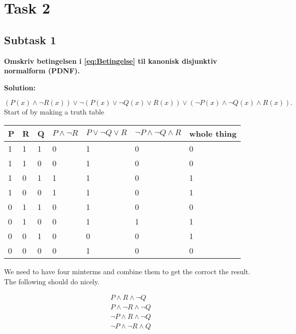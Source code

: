 \section{Task 2}
\subsection{Subtask 1}
\noindent
\textbf{Omskriv betingelsen i \eqref{eq:Betingelse} til kanonisk disjunktiv normalform (PDNF). }

\bigskip
\noindent
\textbf{Solution:} 

\begin{equation}
	(P(x)\wedge \neg R(x)) \vee \neg(P(x)\vee \neg Q(x) \vee R(x)) \vee (\neg P(x) \wedge \neg Q(x) \wedge R(x)).
\end{equation}
Start of by making a truth table 
\begin{table}[ht!]
\centering
\begin{tabular}{|l|l|l|l|l|l|l|}
P & R & Q & $P\wedge \neg R$ & $P\vee \neg Q \vee R$ & $\neg P \wedge \neg Q \wedge R$ & whole thing \\ \hline
1    & 1    & 1    & 0           & 1               & 0                     & 0               \\ \hline
1    & 1    & 0    & 0           & 1               & 0                     & 0               \\ \hline
1    & 0    & 1    & 1           & 1               & 0                     & 1               \\ \hline
1    & 0    & 0    & 1           & 1               & 0                     & 1               \\ \hline
0    & 1    & 1    & 0           & 1               & 0                     & 0               \\ \hline
0    & 1    & 0    & 0           & 1               & 1                     & 1               \\ \hline
0    & 0    & 1    & 0           & 0               & 0                     & 1               \\ \hline
0    & 0    & 0    & 0           & 1               & 0                     & 0               \\ \hline
\end{tabular}
\end{table}

We need to have four minterms and combine them to get the corroct the result. The following should do nicely.

\begin{equation} 
    \begin{aligned}
        P \wedge R \wedge \neg Q \\
        P \wedge \neg R \wedge \neg Q \\
        \neg P \wedge R \wedge \neg Q \\
        \neg P \wedge \neg R \wedge Q
    \end{aligned}
\end{equation}

